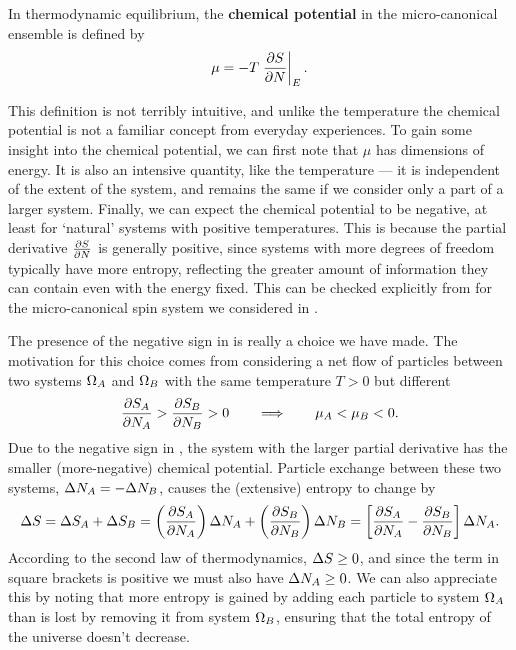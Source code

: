 \begin{shaded}
  In thermodynamic equilibrium, the \textbf{chemical potential} in the micro-canonical ensemble is defined by
  \begin{equation}
    \label{eq:chem_pot}
    \mu = -T \left. \frac{\partial S}{\partial N}\right|_E.
  \end{equation}
\end{shaded}

This definition is not terribly intuitive, and unlike the temperature the chemical potential is not a familiar concept from everyday experiences.
To gain some insight into the chemical potential, we can first note that $\mu$ has dimensions of energy. %
It is also an intensive quantity, like the temperature --- it is independent of the extent of the system, and remains the same if we consider only a part of a larger system.
Finally, we can expect the chemical potential to be negative, at least for `natural' systems with positive temperatures.
This is because the partial derivative $\frac{\partial S}{\partial N}$ is generally positive, since systems with more degrees of freedom typically have more entropy, reflecting the greater amount of information they can contain even with the energy fixed.
This can be checked explicitly from  for the micro-canonical spin system we considered in .

The presence of the negative sign in  is really a choice we have made.
The motivation for this choice comes from considering a net flow of particles between two systems $\Omega_A$ and $\Omega_B$ with the same temperature $T > 0$ but different
\begin{equation*}
  \frac{\partial S_A}{\partial N_A} > \frac{\partial S_B}{\partial N_B} > 0 \qquad \Longrightarrow \qquad \mu_A < \mu_B < 0.
\end{equation*}
Due to the negative sign in , the system with the larger partial derivative has the smaller (more-negative) chemical potential.
Particle exchange between these two systems, $\Delta N_A = -\Delta N_B$, causes the (extensive) entropy to change by
\begin{equation*}
  \Delta S = \Delta S_A + \Delta S_B = \left(\frac{\partial S_A}{\partial N_A}\right) \Delta N_A + \left(\frac{\partial S_B}{\partial N_B}\right) \Delta N_B = \left[\frac{\partial S_A}{\partial N_A} - \frac{\partial S_B}{\partial N_B}\right] \Delta N_A.
\end{equation*}
According to the second law of thermodynamics, $\Delta S \geq 0$, and since the term in square brackets is positive we must also have $\Delta N_A \geq 0$.
We can also appreciate this by noting that more entropy is gained by adding each particle to system $\Omega_A$ than is lost by removing it from system $\Omega_B$, ensuring that the total entropy of the universe doesn't decrease.

